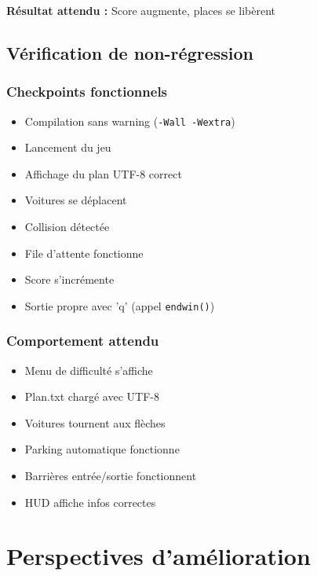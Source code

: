 \documentclass[12pt,a4paper]{article}
\begin{document}
\textbf{Résultat attendu :} Score augmente, places se libèrent

\subsection{Vérification de non-régression}

\subsubsection{Checkpoints fonctionnels}

\begin{itemize}
    \item[$\square$] Compilation sans warning (\texttt{-Wall -Wextra})
    \item[$\square$] Lancement du jeu
    \item[$\square$] Affichage du plan UTF-8 correct
    \item[$\square$] Voitures se déplacent
    \item[$\square$] Collision détectée
    \item[$\square$] File d'attente fonctionne
    \item[$\square$] Score s'incrémente
    \item[$\square$] Sortie propre avec 'q' (appel \texttt{endwin()})
\end{itemize}

\subsubsection{Comportement attendu}

\begin{itemize}
    \item Menu de difficulté s'affiche
    \item Plan.txt chargé avec UTF-8
    \item Voitures tournent aux flèches
    \item Parking automatique fonctionne
    \item Barrières entrée/sortie fonctionnent
    \item HUD affiche infos correctes
\end{itemize}


\section{Perspectives d'amélioration}
\end{document}
